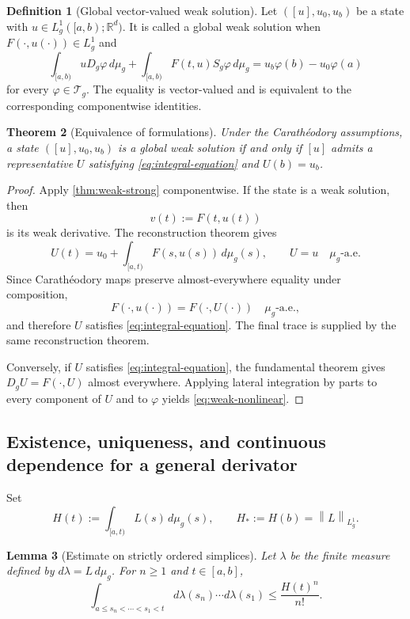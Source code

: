 \documentclass[preprint,12pt]{elsarticle}
\newtheorem{theorem}{Theorem}[section]
\newtheorem{lemma}[theorem]{Lemma}
\theoremstyle{definition}
\newtheorem{definition}[theorem]{Definition}
\theoremstyle{remark}
\newcommand{\R}{\mathbb R}
\newcommand{\norm}[1]{\left\lVert#1\right\rVert}
\begin{document}
\begin{definition}[Global vector-valued weak solution]\label{def:weak-solution}
Let $([u],u_0,u_b)$ be a state with $u\in L_g^1([a,b);\R^d)$. It is called a global weak solution when $F(\cdot,u(\cdot))\in L_g^1$ and
\begin{equation}\label{eq:weak-nonlinear}
 \int_{[a,b)}uD_g\varphi\,d\mu_g
 +\int_{[a,b)}F(t,u)S_g\varphi\,d\mu_g
 =u_b\varphi(b)-u_0\varphi(a)
\end{equation}
for every $\varphi\in\mathcal T_g$. The equality is vector-valued and is equivalent to the corresponding componentwise identities.
\end{definition}

\begin{theorem}[Equivalence of formulations]\label{thm:nonlinear-equivalence}
Under the Carath\'eodory assumptions, a state $([u],u_0,u_b)$ is a global weak solution if and only if $[u]$ admits a representative $U$ satisfying \eqref{eq:integral-equation} and $U(b)=u_b$.
\end{theorem}

\begin{proof}
Apply \cref{thm:weak-strong} componentwise. If the state is a weak solution, then
\[
 v(t):=F(t,u(t))
\]
is its weak derivative. The reconstruction theorem gives
\[
 U(t)=u_0+\int_{[a,t)}F(s,u(s))\,d\mu_g(s),
 \qquad U=u\quad\mu_g\text{-a.e.}
\]
Since Carath\'eodory maps preserve almost-everywhere equality under composition,
\[
 F(\cdot,u(\cdot))=F(\cdot,U(\cdot))
 \quad\mu_g\text{-a.e.},
\]
and therefore $U$ satisfies \eqref{eq:integral-equation}. The final trace is supplied by the same reconstruction theorem.

Conversely, if $U$ satisfies \eqref{eq:integral-equation}, the fundamental theorem gives $D_gU=F(\cdot,U)$ almost everywhere. Applying lateral integration by parts to every component of $U$ and to $\varphi$ yields \eqref{eq:weak-nonlinear}.
\end{proof}

\subsection{Existence, uniqueness, and continuous dependence for a general derivator}

Set
\[
 H(t):=\int_{[a,t)}L(s)\,d\mu_g(s),
 \qquad H_*:=H(b)=\norm{L}_{L_g^1}.
\]

\begin{lemma}[Estimate on strictly ordered simplices]\label{lem:ordered-simplex}
Let $\lambda$ be the finite measure defined by $d\lambda=L\,d\mu_g$. For $n\ge1$ and $t\in[a,b]$,
\[
 \int_{a\le s_n<\cdots<s_1<t}
 d\lambda(s_n)\cdots d\lambda(s_1)
 \le \frac{H(t)^n}{n!}.
\]
\end{lemma}
\end{document}
